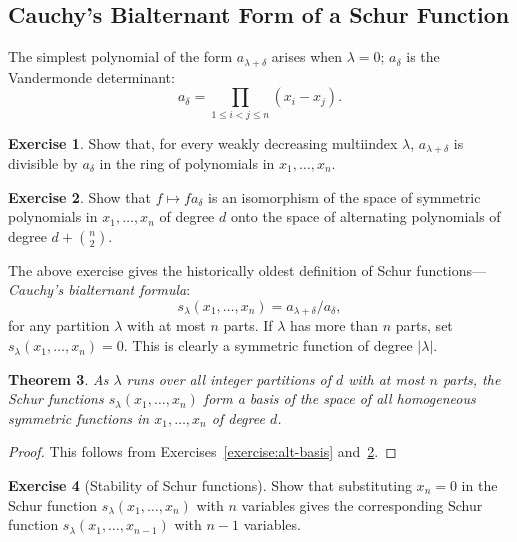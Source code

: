 \documentclass[11pt]{amsart}
\newtheorem{theorem}{Theorem}[subsection]
\theoremstyle{definition}
\theoremstyle{example}
\newtheorem{exercise}[theorem]{Exercise}
\begin{document}
\subsection{Cauchy's Bialternant Form of a Schur Function}
\label{sec:cauchys-bialt-form}
The simplest polynomial of the form $a_{\lambda+\delta}$ arises when $\lambda=0$; $a_\delta$ is the Vandermonde determinant:
\begin{displaymath}
  a_\delta = \prod_{1\leq i<j\leq n}(x_i-x_j).
\end{displaymath}
\begin{exercise}
  Show that, for every weakly decreasing multiindex $\lambda$, $a_{\lambda+\delta}$ is divisible by $a_\delta$ in the ring of polynomials in $x_1,\dotsc,x_n$.
\end{exercise}
\begin{exercise}
  \label{exercise:vandermonde-iso}
  Show that $f\mapsto fa_\delta$ is an isomorphism of the space of symmetric polynomials in $x_1,\dotsc, x_n$ of degree $d$ onto the space of alternating polynomials of degree $d + \binom n2$.
\end{exercise}
The above exercise gives the historically oldest definition of Schur functions---\emph{Cauchy's bialternant formula}:
\begin{equation}
  \label{eq:schur}
  s_\lambda(x_1,\dotsc,x_n) = a_{\lambda+\delta}/a_\delta,
\end{equation}
for any partition $\lambda$ with at most $n$ parts.
If $\lambda$ has more than $n$ parts, set $s_\lambda(x_1,\dotsc,x_n) =0$.
This is clearly a symmetric function of degree $|\lambda|$.
\begin{theorem}
  As $\lambda$ runs over all integer partitions of $d$ with at most $n$ parts, the Schur functions $s_\lambda(x_1,\dotsc,x_n)$ form a basis of the space of all homogeneous symmetric functions in $x_1,\dotsc,x_n$ of degree $d$.
\end{theorem}
\begin{proof}
  This follows from Exercises~\ref{exercise:alt-basis} and~\ref{exercise:vandermonde-iso}.
\end{proof}
\begin{exercise}
  [Stability of Schur functions]
  Show that substituting $x_n=0$ in the Schur function $s_\lambda(x_1,\dotsc, x_n)$ with $n$ variables gives the corresponding Schur function $s_\lambda(x_1,\dotsc,x_{n-1})$ with $n-1$ variables.
\end{exercise}
\end{document}
